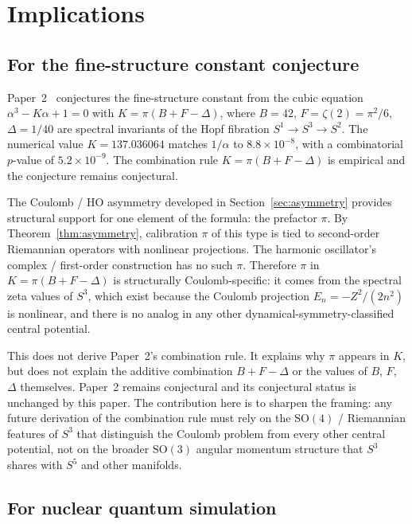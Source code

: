 \documentclass[twocolumn,pra,amsmath,amssymb,superscriptaddress]{revtex4-2}
\begin{document}
\section{Implications}
\label{sec:imp}

\subsection{For the fine-structure constant conjecture}
\label{sec:alpha}

Paper~2~\cite{paper2_alpha} conjectures the fine-structure
constant from the cubic equation $\alpha^3 - K \alpha + 1 = 0$
with $K = \pi (B + F - \Delta)$, where $B = 42$, $F = \zeta(2) =
\pi^2/6$, $\Delta = 1/40$ are spectral invariants of the Hopf
fibration $S^1 \to S^3 \to S^2$.  The numerical value $K =
137.036064$ matches $1/\alpha$ to $8.8 \times 10^{-8}$, with a
combinatorial $p$-value of $5.2 \times 10^{-9}$.  The combination
rule $K = \pi(B + F - \Delta)$ is empirical and the conjecture
remains conjectural.

The Coulomb / HO asymmetry developed in Section~\ref{sec:asymmetry}
provides structural support for one element of the formula: the
prefactor $\pi$.  By Theorem~\ref{thm:asymmetry}, calibration
$\pi$ of this type is tied to second-order Riemannian operators
with nonlinear projections.  The harmonic oscillator's
complex / first-order construction has no such $\pi$.  Therefore
$\pi$ in $K = \pi(B + F - \Delta)$ is structurally Coulomb-specific:
it comes from the spectral zeta values of $S^3$, which exist
because the Coulomb projection $E_n = -Z^2/(2 n^2)$ is nonlinear,
and there is no analog in any other dynamical-symmetry-classified
central potential.

This does not derive Paper~2's combination rule.  It explains why
$\pi$ appears in $K$, but does not explain the additive
combination $B + F - \Delta$ or the values of $B$, $F$, $\Delta$
themselves.  Paper~2 remains conjectural and its conjectural
status is unchanged by this paper.  The contribution here is to
sharpen the framing: any future derivation of the combination
rule must rely on the $\mathrm{SO}(4)$ / Riemannian features of
$S^3$ that distinguish the Coulomb problem from every other
central potential, not on the broader $\mathrm{SO}(3)$ angular
momentum structure that $S^3$ shares with $S^5$ and other
manifolds.

\subsection{For nuclear quantum simulation}
\label{sec:nuclear}
\end{document}
